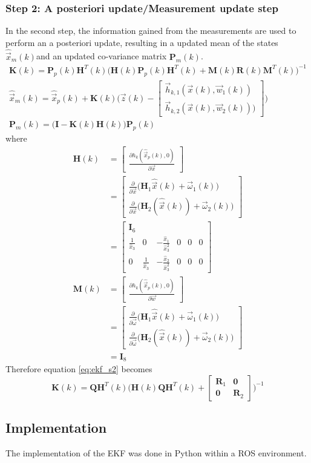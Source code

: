 \subsubsection{Step 2: A posteriori update/Measurement update step}
In the second step, the information gained from the measurements are used to perform an a posteriori update, resulting in a updated mean of the states $\hat{\vec x}_m(k)$and an updated co-variance matrix $\textbf{P}_m(k)$.
\begin{align}
	\textbf{K}(k) = \textbf{P}_p(k) \textbf{H}^T(k) \Big( \textbf{H}(k) \textbf{P}_p(k) \textbf{H}^T(k) + \textbf{M}(k) \textbf{R}(k) \textbf{M}^T(k)\Big)^{-1} \label{eq:ekf_s2}\\
	\hat{\vec x}_m(k) = \hat{\vec x}_p(k) + \textbf{K}(k) \Big( \vec z(k) - \begin{bmatrix}
	\vec h_{k,1}(\vec x(k), \vec w_1(k))\\
	\vec h_{k,2}(\vec x(k), \vec w_2(k)))
	\end{bmatrix} \Big)\\
	\textbf{P}_m(k) = \big( \textbf{I} - \textbf{K}(k)\textbf{H}(k)\big) \textbf{P}_p(k)
\end{align}
where
\begin{align}
  \textbf{H}(k) &= \begin{bmatrix}
    \frac{\partial h_k(\hat{\vec x}_p(k), 0)}{\partial \vec x}
  \end{bmatrix}\\
  &= \begin{bmatrix}
		\frac{\partial}{\partial \vec x} \big( \textbf{H}_1 \hat{\vec x}(k) + \vec \omega_1(k) \big)\\
		\frac{\partial}{\partial \vec x} \big( \textbf{H}_2(\hat{\vec x}(k)) + \vec \omega_2(k) \big)
	\end{bmatrix}\\
	&= \begin{bmatrix}
		\textbf{I}_6\\
		\frac{1}{\hat{x}_3} & 0 & -\frac{\hat{x}_1}{\hat{x}^2_3} & 0 & 0 & 0\\
		0 & \frac{1}{\hat{x}_3} & -\frac{\hat{x}_2}{\hat{x}^2_3} & 0 & 0 & 0
	\end{bmatrix}\\
  \textbf{M}(k) & = \begin{bmatrix}
    \frac{\partial h_k(\hat{\vec x}_p(k), 0)}{\partial \vec w}
  \end{bmatrix}\\
  &= \begin{bmatrix}
		\frac{\partial}{\partial \vec \omega} \big( \textbf{H}_1 \hat{\vec x}(k) + \vec \omega_1(k) \big)\\
		\frac{\partial}{\partial \vec \omega} \big( \textbf{H}_2(\hat{\vec x}(k)) + \vec \omega_2(k) \big)
	\end{bmatrix}\\
	&= \textbf{I}_8
\end{align}
Therefore equation \ref{eq:ekf_s2} becomes
$$\textbf{K}(k) = \textbf{Q} \textbf{H}^T(k) \Big( \textbf{H}(k) \textbf{Q} \textbf{H}^T(k) + \begin{bmatrix}
	\textbf{R}_1 & \textbf{0}\\
	\textbf{0} &\textbf{R}_2
\end{bmatrix} \Big)^{-1}$$

\subsection{Implementation}
The implementation of the EKF was done in Python within a ROS environment.
